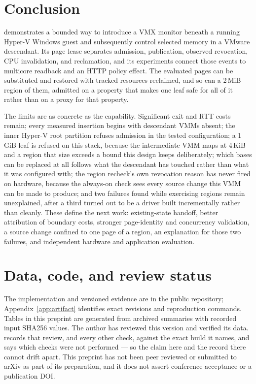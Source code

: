 \section{Conclusion}
\ks{} demonstrates a bounded way to introduce a VMX monitor beneath a running
Hyper-V Windows guest and subsequently control selected memory in a VMware
descendant. Its page lease separates admission, publication, observed revocation,
CPU invalidation, and reclamation, and its experiments connect those events to
multicore readback and an HTTP policy effect. The evaluated pages can be
substituted and restored with tracked resources reclaimed, and so can a 2\,MiB
region of them, admitted on a property that makes one leaf safe for all of it
rather than on a proxy for that property.

The limits are as concrete as the capability. Significant exit and RTT costs
remain; every measured insertion begins with descendant VMMs absent; the inner
Hyper-V root partition refuses admission in the tested configuration; a 1\,GiB
leaf is refused on this stack, because the intermediate VMM maps at 4\,KiB and a
region that size exceeds a bound this design keeps deliberately; which bases can
be replaced at all follows what the descendant has touched rather than what it
was configured with; the region recheck's own revocation reason has never fired
on hardware, because the always-on check sees every source change this VMM can
be made to produce; and two failures found while exercising regions remain
unexplained, after a third turned out to be a driver built incrementally rather
than cleanly. These define the next work: existing-state handoff, better
attribution of boundary costs, stronger page-identity and concurrency
validation, a source change confined to one page of a region, an explanation for
those two failures, and independent hardware and application evaluation.

\section*{Data, code, and review status}
The implementation and versioned evidence are in the public \ks{} repository;
Appendix~\ref{app:artifact} identifies exact revisions and reproduction commands.
Tables in this preprint are generated from archived summaries with recorded
input SHA256 values. The author has reviewed this version and verified its data.
 records that review, and every
other check, against the exact build it names, and says which checks were not
performed --- so the claim here and the record there cannot drift apart. This
preprint has not been peer reviewed or submitted to arXiv as part of its
preparation, and it does not
assert conference acceptance or a publication DOI.

